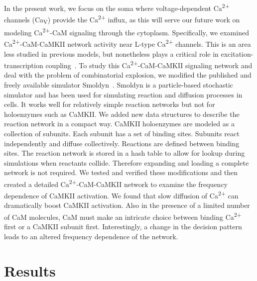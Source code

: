 \documentclass[10pt,letterpaper]{article}
\begin{document}
In the present work, we focus on the soma where voltage-dependent Ca\textsuperscript{2+} channels (Ca\textsubscript{V}) provide the Ca\textsuperscript{2+} influx, as this will serve our future work on modeling Ca\textsuperscript{2+}-CaM signaling through the cytoplasm. Specifically, we examined Ca\textsuperscript{2+}-CaM-CaMKII network activity near L-type Ca\textsuperscript{2+} channels. This is an area less studied in previous models, but nonetheless plays a critical role in excitation-transcription coupling~\cite{Ma:2015bg,Li:2016cq}. To study this Ca\textsuperscript{2+}-CaM-CaMKII signaling network and deal with the problem of combinatorial explosion, we modified the published and freely available simulator Smoldyn~\cite{Andrews:2004fs}. Smoldyn is a particle-based stochastic simulator and has been used for simulating reaction and diffusion processes in cells. It works well for relatively simple reaction networks but not for holoenzymes such as CaMKII. We added new data structures to describe the reaction network in a compact way. CaMKII holoenzymes are modeled as a collection of subunits. Each subunit has a set of binding sites. Subunits react independently and diffuse collectively. Reactions are defined between binding sites. The reaction network is stored in a hash table to allow for lookup during simulations when reactants collide. Therefore expanding and loading a complete network is not required. We tested and verified these modifications and then created a detailed Ca\textsuperscript{2+}-CaM-CaMKII network to examine the frequency dependence of CaMKII activation. We found that slow diffusion of Ca\textsuperscript{2+} can dramatically boost CaMKII activation. Also in the presence of a limited number of CaM molecules, CaM must make an intricate choice between binding Ca\textsuperscript{2+} first or a CaMKII subunit first. Interestingly, a change in the decision pattern leads to an altered frequency dependence of the network. 

\section*{Results}
\end{document}
